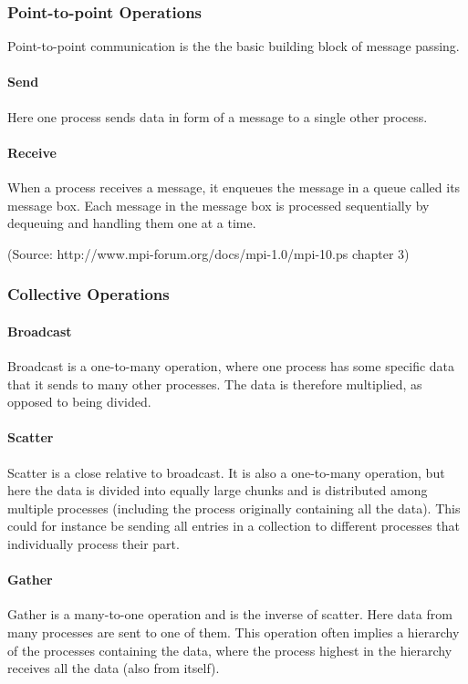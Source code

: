 \subsubsection{Point-to-point Operations}
Point-to-point communication is the the basic building block of message passing.
\paragraph{Send}
Here one process sends data in form of a message to a single other process.
\paragraph{Receive}
When a process receives a message, it enqueues the message in a queue called its message box. Each message in the message box is processed sequentially by dequeuing and handling them one at a time.

(Source: http://www.mpi-forum.org/docs/mpi-1.0/mpi-10.ps chapter 3)

\subsubsection{Collective Operations}
\paragraph{Broadcast}
Broadcast is a one-to-many operation, where one process has some specific data that it sends to many other processes. The data is therefore multiplied, as opposed to being divided.

\paragraph{Scatter}
Scatter is a close relative to broadcast. It is also a one-to-many operation, but here the data is divided into equally large chunks and is distributed among multiple processes (including the process originally containing all the data). This could for instance be sending all entries in a collection to different processes that individually process their part.

\paragraph{Gather}
Gather is a many-to-one operation and is the inverse of scatter. Here data from many processes are sent to one of them. This operation often implies a hierarchy of the processes containing the data, where the process highest in the hierarchy receives all the data (also from itself).

